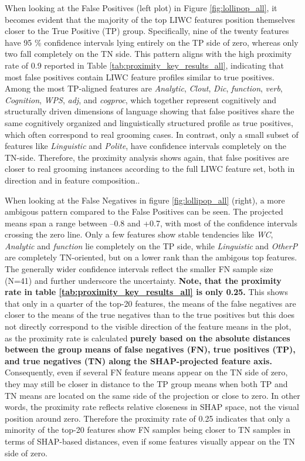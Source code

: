 When looking at the False Positives (left plot) in Figure \ref{fig:lollipop_all}, it becomes evident that the majority of the top LIWC features position themselves closer to the True Positive (TP) group. Specifically, nine of the twenty features have 95 \% confidence intervals lying entirely on the TP side of zero, whereas only two fall completely on the TN side. This pattern aligns with the high proximity rate of 0.9 reported in Table \ref{tab:proximity_key_results_all}, indicating that most false positives contain LIWC feature profiles similar to true positives. Among the most TP-aligned features are \textit{Analytic}, \textit{Clout}, \textit{Dic}, \textit{function}, \textit{verb}, \textit{Cognition}, \textit{WPS}, \textit{adj}, and \textit{cogproc}, which together represent cognitively and structurally driven dimensions of language showing that false positives share the same cognitively organized and linguistically structured profile as true positives, which often correspond to real grooming cases. In contrast, only a small subset of features like \textit{Linguistic} and \textit{Polite}, have confidence intervals completely on the TN-side. Therefore, the proximity analysis shows again, that false positives are closer to real grooming instances according to the full LIWC feature set, both in direction and in feature composition..

When looking at the False Negatives in figure \ref{fig:lollipop_all} (right), a more ambigous pattern  compared to the False Positives can be seen. The projected means span a range between –0.8 and +0.7, with most of the confidence intervals crossing the zero line. Only a few features show stable tendencies like \textit{WC},  \textit{Analytic} and \textit{function} lie completely on the TP side, while \textit{Linguistic} and \textit{OtherP} are completely TN-oriented, but on a lower rank than the ambigous top features. The generally wider confidence intervals reflect the smaller FN sample size (N=41) and further underscore the uncertainty. \textbf{Note, that the proximity rate in table \ref{tab:proximity_key_results_all} is only 0.25.} This shows that only in a quarter of the top-20 features, the means of the false negatives are closer to the means of the true negatives than to the true positives but this does not directly correspond to the visible direction of the feature means in the plot, as the proximity rate is calculated \textbf{purely based on the absolute distances between the group means of false negatives (FN), true positives (TP), and true negatives (TN) along the SHAP-projected feature axis.} Consequently, even if several FN feature means appear on the TN side of zero, they may still be closer in distance to the TP group means when both TP and TN means are located on the same side of the projection or close to zero. In other words, the proximity rate reflects relative closeness in SHAP space, not the visual position around zero. Therefore the proximity rate of 0.25 indicates that only a minority of the top-20 features show FN samples being closer to TN samples in terms of SHAP-based distances, even if some features visually appear on the TN side of zero.


